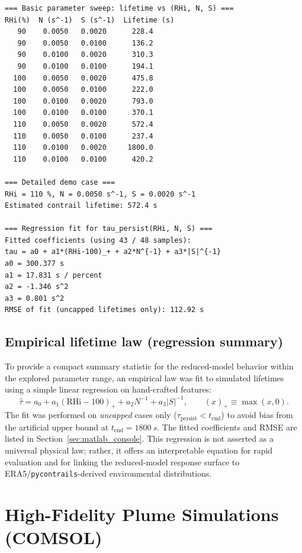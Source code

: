 \documentclass[11pt]{article}
\begin{document}
\begin{verbatim}
=== Basic parameter sweep: lifetime vs (RHi, N, S) ===
RHi(%)  N (s^-1)  S (s^-1)  Lifetime (s)
   90    0.0050   0.0020      228.4
   90    0.0050   0.0100      136.2
   90    0.0100   0.0020      310.3
   90    0.0100   0.0100      194.1
  100    0.0050   0.0020      475.8
  100    0.0050   0.0100      222.0
  100    0.0100   0.0020      793.0
  100    0.0100   0.0100      370.1
  110    0.0050   0.0020      572.4
  110    0.0050   0.0100      237.4
  110    0.0100   0.0020     1800.0
  110    0.0100   0.0100      420.2

=== Detailed demo case ===
RHi = 110 %, N = 0.0050 s^-1, S = 0.0020 s^-1
Estimated contrail lifetime: 572.4 s

=== Regression fit for tau_persist(RHi, N, S) ===
Fitted coefficients (using 43 / 48 samples):
tau = a0 + a1*(RHi-100)_+ + a2*N^{-1} + a3*|S|^{-1}
a0 = 300.377 s
a1 = 17.831 s / percent
a2 = -1.346 s^2
a3 = 0.801 s^2
RMSE of fit (uncapped lifetimes only): 112.92 s
\end{verbatim}

\subsection{Empirical lifetime law (regression summary)}
\label{sec:matlab_regression}

To provide a compact summary statistic for the reduced-model behavior within the explored parameter
range, an empirical law was fit to simulated lifetimes using a simple linear regression on
hand-crafted features:
\begin{equation}
\hat{\tau}
=
a_0
+
a_1(\mathrm{RHi}-100)_+
+
a_2 N^{-1}
+
a_3 |S|^{-1},
\qquad (x)_+ \equiv \max(x,0).
\label{eq:tau_fit}
\end{equation}
The fit was performed on \emph{uncapped} cases only ($\tau_{\mathrm{persist}}<t_{\mathrm{end}}$) to avoid bias from
the artificial upper bound at $t_{\mathrm{end}}=1800~\si{s}$. The fitted coefficients and RMSE are listed in
Section~\ref{sec:matlab_console}. This regression is not asserted as a universal physical law; rather, it offers
an interpretable equation for rapid evaluation and for linking the reduced-model response surface to
ERA5/\texttt{pycontrails}-derived environmental distributions.

\section{High-Fidelity Plume Simulations (COMSOL)}
\label{sec:comsol}
\end{document}
